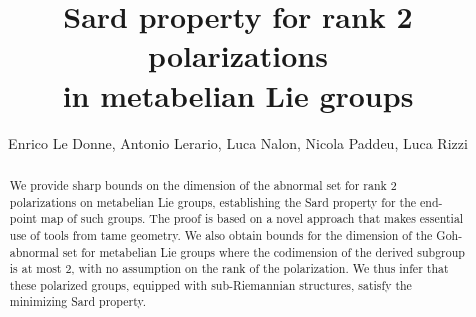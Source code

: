 \documentclass[a4paper,11pt,reqno]{amsart}
\author[E. Le Donne, A. Lerario, L. Nalon, N. Paddeu, L. Rizzi]{Enrico Le Donne, Antonio Lerario, Luca Nalon, Nicola Paddeu, Luca Rizzi}
\theoremstyle{plain}
\theoremstyle{definition}
\begin{document}
	
	\title[Sard property in rank $2$ metabelian groups]{Sard property for rank 2 polarizations \\ in metabelian Lie groups}
	
	\begin{abstract} We provide sharp bounds on the dimension of the abnormal set for rank $2$ polarizations on metabelian Lie groups, establishing the Sard property for the end-point map of such groups. The proof is based on a novel approach that makes essential use of tools from tame geometry. We also obtain bounds for the dimension of the Goh-abnormal set for metabelian Lie groups where the codimension of the derived subgroup is at most $2$, with no assumption on the rank of the polarization. We thus infer that these polarized groups, equipped with sub-Riemannian structures, satisfy the minimizing Sard property.
	\end{abstract}
	\maketitle
	\tableofcontents
    
\end{document}
